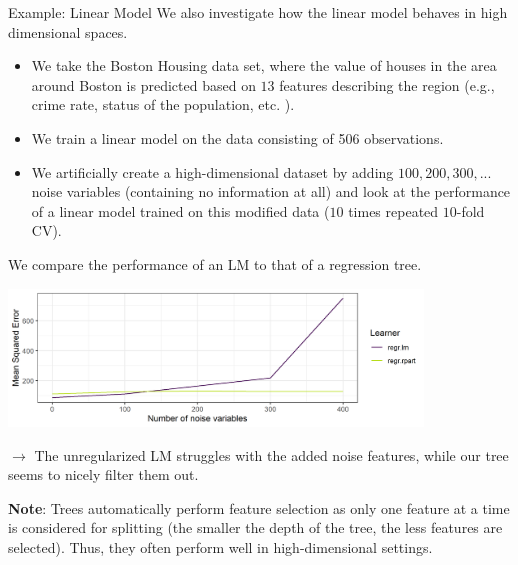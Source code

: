 \begin{vbframe}{Example: Linear Model}
We also investigate how the linear model behaves in high dimensional spaces.

\begin{itemize}
\item We take the Boston Housing data set, where the value of houses in the area around Boston is predicted based on $13$ features describing the region (e.g., crime rate, status of the population, etc. ).
\item We train a linear model on the data consisting of 506 observations. 
\item We artificially create a high-dimensional dataset by adding $100, 200, 300, ...$ noise variables (containing no information at all) and look at the performance of a linear model trained on this modified data ($10$ times repeated $10$-fold CV).
\end{itemize}
\framebreak

We compare the performance of an LM to that of a regression tree.

\vspace*{0.1cm}
\begin{center}
\includegraphics[width = 11cm ]{figure/lm_mse_plot.png}
\end{center}


$\rightarrow$ The unregularized LM struggles with the added noise features, while our tree seems to nicely filter them out.

\vfill

\begin{footnotesize}
\textbf{Note}: Trees automatically perform feature selection as only one feature at a time is considered for splitting (the smaller the depth of the tree, the less features are selected). Thus, they often perform well in high-dimensional settings. 
\end{footnotesize}


\end{vbframe}
